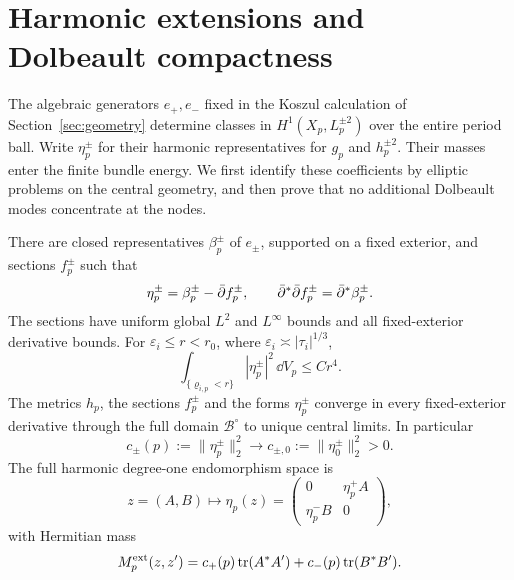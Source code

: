 \section{Harmonic extensions and Dolbeault compactness}
\label{sec:harmonic-extensions}

The algebraic generators $e_+,e_-$ fixed in the Koszul calculation
of Section~\ref{sec:geometry} determine classes in
$H^1(X_p,L_p^{\pm2})$ over the entire period ball. Write
$\eta_p^\pm$ for their harmonic representatives for $g_p$ and
$h_p^{\pm2}$. Their masses enter the finite bundle energy.
We first identify these coefficients by elliptic problems on
the central geometry, and then prove that no additional
Dolbeault modes concentrate at the nodes.

\begin{proposition}\label{prop:harmonic-masses}
There are closed representatives $\beta_p^\pm$ of $e_\pm$,
supported on a fixed exterior, and sections $f_p^\pm$ such that
\begin{equation}\label{eq:harmonic-section-projection}
 \eta_p^\pm=\beta_p^\pm-\bar\partial f_p^\pm,
 \qquad \bar\partial^*\bar\partial f_p^\pm=\bar\partial^*\beta_p^\pm.
\end{equation}
The sections have uniform global $L^2$ and $L^\infty$ bounds
and all fixed-exterior derivative bounds. For
$\varepsilon_i\le r<r_0$, where $\varepsilon_i\asymp|\tau_i|^{1/3}$,
\begin{equation}\label{eq:harmonic-cap-mass}
 \int_{\{\varrho_{i,p}<r\}}|\eta_p^\pm|^2\,\dd V_p\le Cr^4.
\end{equation}
The metrics $h_p$, the sections $f_p^\pm$ and the forms
$\eta_p^\pm$ converge in every fixed-exterior derivative
through the full domain $\mathcal B^\circ$ to unique central
limits. In particular
\begin{equation}\label{eq:extension-coefficients}
 c_\pm(p):=\|\eta_p^\pm\|_2^2
        \longrightarrow c_{\pm,0}:=\|\eta_0^\pm\|_2^2>0.
\end{equation}
The full harmonic degree-one endomorphism space is
\begin{equation}\label{eq:harmonic-arrow-form}
 z=(A,B)\longmapsto\eta_p(z)=
   \begin{pmatrix}0&\eta_p^+ A\\ \eta_p^- B&0\end{pmatrix},
\end{equation}
with Hermitian mass
\begin{equation}\label{eq:extension-mass}
 M_p^{\rm ext}(z,z')=c_+(p)\operatorname{tr}(A^*A')+c_-(p)\operatorname{tr}(B^*B').
\end{equation}
\end{proposition}

